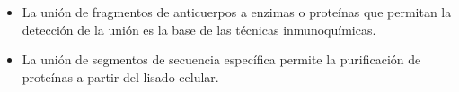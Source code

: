 \begin{itemize}
\item La unión de fragmentos de anticuerpos a enzimas o proteínas que permitan la detección de la unión es la base de las técnicas inmunoquímicas.
\item La unión de segmentos de secuencia específica permite la purificación de proteínas a partir del lisado celular. 

\end{itemize}





